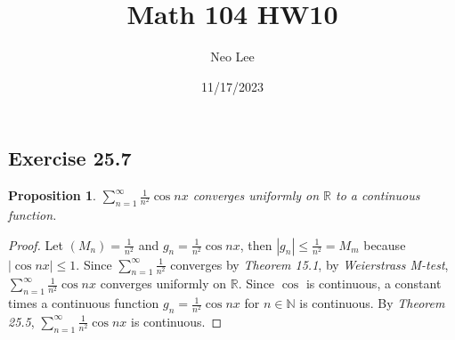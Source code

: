 \documentclass{article}
\title{Math 104 HW10}
\author{Neo Lee}
\date{11/17/2023}
\newtheorem{proposition}[thm]{Proposition}
\newcommand*{\R}{\ensuremath{\mathbb{R}}}
\newcommand*{\N}{\ensuremath{\mathbb{N}}}
\begin{document}
 

\maketitle 

\subsection*{Exercise 25.7}
\begin{proposition}
    $\sum_{n=1}^{\infty}\frac{1}{n^2}\cos nx$ converges uniformly on $\R$ to a continuous 
    function.
\end{proposition}
\begin{proof}
    Let $(M_n)=\frac{1}{n^2}$ and $g_n=\frac{1}{n^2}\cos nx$, then $|g_n|\le \frac{1}{n^2}=M_m$ 
    because $|\cos nx|\le 1$. Since $\sum_{n=1}^{\infty}\frac{1}{n^2}$ converges by 
    \emph{Theorem 15.1}, by \emph{Weierstrass M-test}, $\sum_{n=1}^{\infty}\frac{1}{n^2}\cos nx$
    converges uniformly on $\R$. Since $\cos$ is continuous, a constant times a continuous function 
    $g_n=\frac{1}{n^2}\cos nx$ for $n\in\N$ is continuous. By \emph{Theorem 25.5}, 
    $\sum_{n=1}^{\infty}\frac{1}{n^2}\cos nx$ is continuous.
\end{proof}

\newpage
\end{document}
